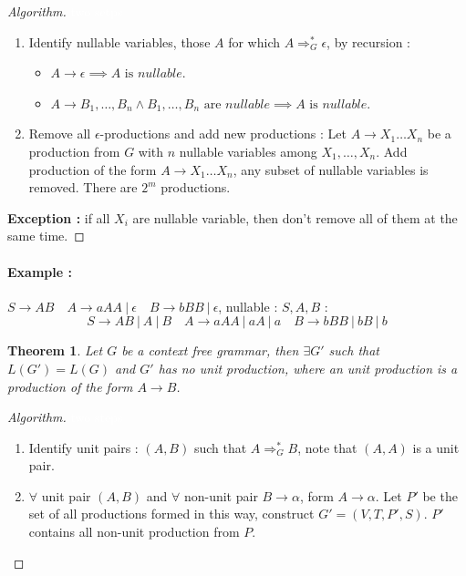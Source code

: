 \documentclass[a4paper,11pt]{article}
\newcommand{\white}[1]{{\textcolor{white}{#1}}}
\newtheorem{thm}{Theorem}[section]
\begin{document}
\begin{proof}[Algorithm]
  \white{two setps}
  \begin{enumerate}
  \item Identify nullable variables, those $A$ for which $A \Rightarrow_G^*
    \epsilon$, by recursion :
    \begin{itemize}
    \item $A \to \epsilon \implies A \text{ is } nullable$.
    \item $A \to B_1,\dots,B_n \wedge B_1,\dots,B_n \text{ are } nullable
      \implies A \text{ is } nullable$.
    \end{itemize}
  \item Remove all $\epsilon$-productions and add new productions : Let $A \to
    X_1 \dots X_n$ be a production from $G$ with $n$ nullable variables among
    $X_1,\dots,X_n$. Add production of the form $A \to X_1 \dots X_n$, any
    subset of nullable variables is removed. There are $2^m$ productions.
  \end{enumerate}

  \textbf{Exception : } if all $X_i$ are nullable variable, then don't remove
  all of them at the same time.
\end{proof}

\paragraph{Example : } $S \to AB \quad A \to aAA\ |\ \epsilon \quad B \to bBB\
|\ \epsilon$, nullable : $S,A,B$ :
\[
  S \to AB\ |\ A\ |\ B \quad A \to aAA\ |\ aA\ |\ a \quad B \to bBB\ |\ bB\ |\ b
\]

\begin{thm}
  Let $G$ be a context free grammar, then $\exists G'$ such that $L(G') = L(G)$
  and $G'$ has no unit production, where an unit production is a production of
  the form $A \to B$.
\end{thm}

\begin{proof}[Algorithm]
  \white{two steps}
  \begin{enumerate}
  \item Identify unit pairs : $(A,B)$ such that $A \Rightarrow_G^* B$, note that
    $(A,A)$ is a unit pair.
  \item $\forall$ unit pair $(A,B)$ and $\forall$ non-unit pair $B \to \alpha$,
    form $A \to \alpha$. Let $P'$ be the set of all productions formed in this
    way, construct $G'=(V,T,P',S)$. $P'$ contains all non-unit production from $P$.
  \end{enumerate}
\end{proof}
\end{document}
